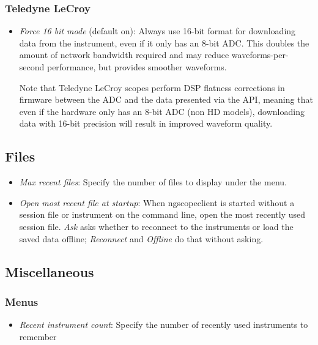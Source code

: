 \subsubsection{Teledyne LeCroy}

\begin{itemize}
\item \emph{Force 16 bit mode} (default on): Always use 16-bit format for downloading data from the instrument, even if
it only has an 8-bit ADC. This doubles the amount of network bandwidth required and may reduce waveforms-per-second
performance, but provides smoother waveforms.

Note that Teledyne LeCroy scopes perform DSP flatness corrections in firmware between the ADC and the data presented
via the API, meaning that even if the hardware only has an 8-bit ADC (non HD models), downloading data with 16-bit
precision will result in improved waveform quality.

\end{itemize}

\subsection{Files}

\begin{itemize}
\item \emph{Max recent files}: Specify the number of files to display under the  menu.
\item \emph{Open most recent file at startup}: When ngscopeclient is started without a session file or instrument on
the command line, open the most recently used session file. \emph{Ask} asks whether to reconnect to the instruments or
load the saved data offline; \emph{Reconnect} and \emph{Offline} do that without asking.
\end{itemize}

\subsection{Miscellaneous}

\subsubsection{Menus}

\begin{itemize}
\item \emph{Recent instrument count}: Specify the number of recently used instruments to remember
\end{itemize}

